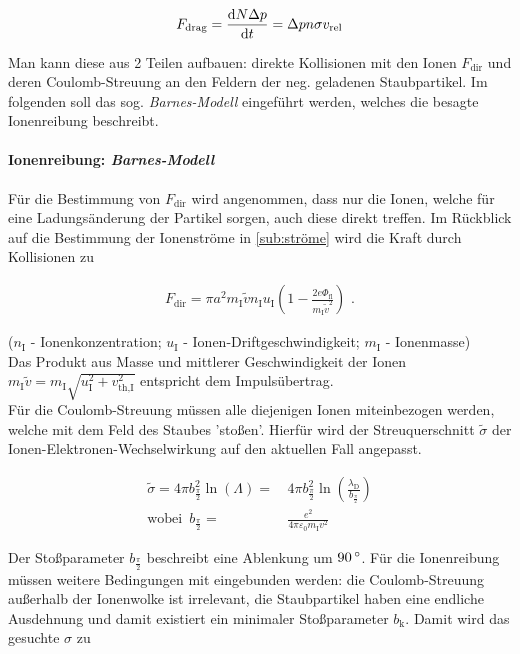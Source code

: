 \documentclass[numbers=noenddot,a4paper]{scrartcl}
\newcommand{\degree}{^\circ}
\newcommand{\diff}{\textnormal{d}}
\newcommand{\ix}[1]{_\text{#1}}
\newcommand{\tilt}[1]{\textit{#1}}
\begin{document}
				\begin{align}
					F\ix{drag}=\frac{\diff N \Delta p}{\diff t}=\Delta p n \sigma v\ix{rel}
				\end{align}

			 Man kann diese aus 2 Teilen aufbauen: direkte Kollisionen mit den Ionen $F\ix{dir}$ und deren Coulomb-Streuung an den Feldern der neg. geladenen Staubpartikel. Im folgenden soll das sog. \tilt{Barnes-Modell} eingeführt werden, welches die besagte Ionenreibung beschreibt.

				\paragraph{Ionenreibung: \tilt{Barnes-Modell}}

				Für die Bestimmung von $F\ix{dir}$ wird angenommen, dass nur die Ionen, welche für eine Ladungsänderung der Partikel sorgen, auch diese direkt treffen. Im Rückblick auf die Bestimmung der Ionenströme in \ref{sub:ströme} wird die Kraft durch Kollisionen zu

					\begin{align}
						F\ix{dir}=\pi a^2m\ix{I}\tilde{v}n\ix{I}u\ix{I}\left(1-\frac{2e\Phi\ix{fl}}{m\ix{I}\tilde{v}^2}\right)\,\,.
					\end{align}

				($n\ix{I}$ - Ionenkonzentration; $u\ix{I}$ - Ionen-Driftgeschwindigkeit; $m\ix{I}$ - Ionenmasse)\\
				Das Produkt aus Masse und mittlerer Geschwindigkeit der Ionen $m\ix{I}\tilde{v}=m\ix{I}\sqrt{u\ix{I}^2+v\ix{th,I}^2}$ entspricht dem Impulsübertrag.\\
				Für die Coulomb-Streuung müssen alle diejenigen Ionen miteinbezogen werden, welche mit dem Feld des Staubes 'stoßen'. Hierfür wird der Streuquerschnitt $\tilde{\sigma}$ der Ionen-Elektronen-Wechselwirkung auf den aktuellen Fall angepasst.

					\begin{align}
						\tilde{\sigma}=4\pi b_{\frac{\pi}{2}}^2\ln\left(\Lambda\right)=&\,4\pi b_{\frac{\pi}{2}}^2\ln\left(\frac{\lambda\ix{D}}{b_{\frac{\pi}{2}}}\right) \\
						\text{wobei }\, b_{\frac{\pi}{2}}=&\,\frac{e^2}{4\pi\varepsilon\ix{0}m\ix{I}v^2} \nonumber
					\end{align}

				Der Stoßparameter $b_{\frac{\pi}{2}}$ beschreibt eine Ablenkung um $\unit[90]{\degree}$. Für die Ionenreibung müssen weitere Bedingungen mit eingebunden werden: die Coulomb-Streuung außerhalb der Ionenwolke ist irrelevant, die Staubpartikel haben eine endliche Ausdehnung und damit existiert ein minimaler Stoßparameter $b\ix{k}$. Damit wird das gesuchte $\sigma$ zu
\end{document}
